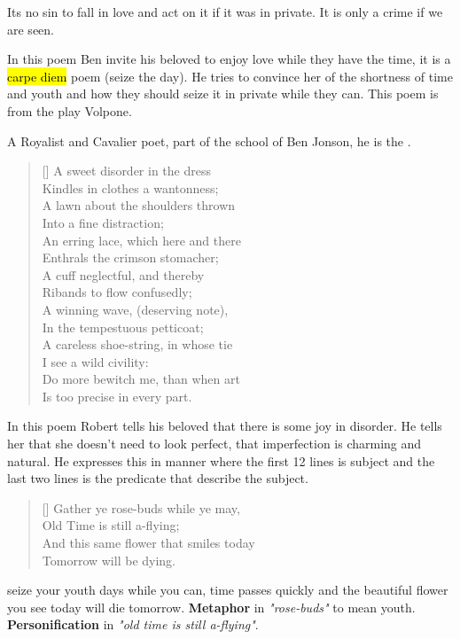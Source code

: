 Its no sin to fall in love and act on it if it was in 
private. It is only a crime if we are seen.



In this poem Ben invite his beloved to enjoy love while 
they have the time, it is a \hl{carpe diem} poem (seize the day).
He tries to convince her of the shortness of time and youth and how
they should seize it in private while they can. This poem is from the play Volpone.


A Royalist and Cavalier poet, part of the school of Ben Jonson,
he is the .

\settowidth{\versewidth}{A sweet disorder in the dress. }
\begin{verse}[\versewidth]
{\fontverse
A sweet disorder in the dress\\
Kindles in clothes a wantonness;\\
A lawn about the shoulders thrown\\
Into a fine distraction;\\
An erring lace, which here and there\\
Enthrals the crimson stomacher;\\
A cuff neglectful, and thereby\\
Ribands to flow confusedly;\\
A winning wave, (deserving note),\\
In the tempestuous petticoat;\\
A careless shoe-string, in whose tie\\
I see a wild civility:\\
Do more bewitch me, than when art\\
Is too precise in every part.
}
\end{verse}


In this poem Robert tells his beloved that there is
some joy in disorder. He tells her that she doesn't 
need to look perfect, that imperfection is charming and natural.
He expresses this in  manner where
the first 12 lines is subject and the last two lines is the 
predicate that describe the subject.

\settowidth{\versewidth}{Gather ye rose-buds while ye may}
\begin{verse}[\versewidth]
{\fontverse
Gather ye rose-buds while ye may,\\
Old Time is still a-flying;\\
And this same flower that smiles today\\
Tomorrow will be dying.
} 
\end{verse}
seize your youth days while you can, time passes quickly and the
beautiful flower you see today will die tomorrow. \textbf{Metaphor} in \textit{"rose-buds"}
to mean youth. \textbf{Personification} in \textit{"old time is still a-flying"}.

